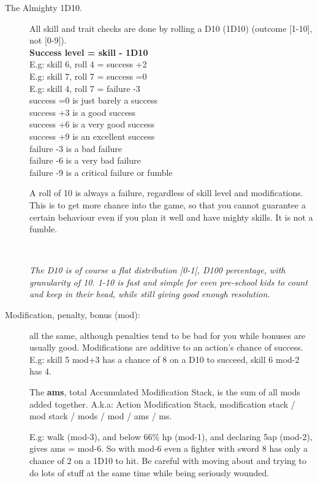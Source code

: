 \begin{description}


\item[The Almighty 1D10.]
All skill and trait checks are done by rolling a D10 (1D10) (outcome [1-10], not [0-9]).\\
\textbf{Success level = skill - 1D10} \\
E.g: skill 6, roll 4 = success +2 \\
E.g: skill 7, roll 7 = success =0 \\
E.g: skill 4, roll 7 = failure -3 \\
success =0 is just barely a success \\
success +3 is a good success \\
success +6 is a very good success \\
success +9 is an excellent success \\
failure -3 is a bad failure \\
failure -6 is a very bad failure \\
failure -9 is a critical failure or fumble

A roll of 10 is always a failure, regardless of skill level and modifications. This is to get more chance into the game, so that you cannot guarantee a certain behaviour even if you plan it well and have mighty skills.
It is not a fumble.

\

\textit{The D10 is of course a flat distribution ]0-1[, D100 percentage, with granularity of 10. 1-10 is fast and simple for even pre-school kids to count and keep in their head, while still giving good enough resolution.}


\item[Modification, penalty, bonus (mod):]
all the same, although penalties tend to be bad for you while bonuses are usually good. Modifications are additive to an action's chance of success. \\
E.g: skill 5 mod+3 has a chance of 8 on a D10 to succeed, skill 6 mod-2 has 4.

The \textbf{ams}, total Accumulated Modification Stack, is the sum of all mods added together. A.k.a: Action Modification Stack, modification stack / mod stack / mods / mod / ams / ms.

E.g: walk (mod-3), and below 66\% hp (mod-1), and declaring 5ap (mod-2), gives ams = mod-6. So with mod-6 even a fighter with sword 8 has only a chance of 2 on a 1D10 to hit. Be careful with moving about and trying to do lots of stuff at the same time while being seriously wounded.



\end{description}
